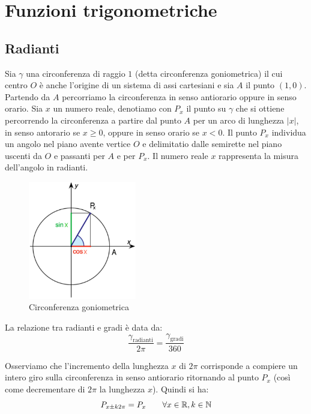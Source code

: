 
\chapter{Funzioni trigonometriche} %

\label{ch:trigonometria} %

\section{Radianti}

Sia $\gamma$ una circonferenza di raggio $1$ (detta circonferenza goniometrica) il cui centro $O$ è anche l'origine di un sistema di assi cartesiani e sia $A$ il punto $(1,0)$.
Partendo da $A$ percorriamo la circonferenza in senso antiorario oppure in senso orario.
Sia $x$ un numero reale, denotiamo con $P_x$ il punto su $\gamma$ che si ottiene percorrendo la circonferenza a partire dal punto $A$ per un arco di lunghezza $|x|$, in senso antorario se $x \geq 0$, oppure in senso orario se $x<0$.
Il punto $P_x$ individua un angolo nel piano avente vertice $O$ e delimitatio dalle semirette nel piano uscenti da $O$ e passanti per $A$ e per $P_x$.
Il numero reale $x$ rappresenta la misura dell'angolo in radianti.

\begin{figure}
  \begin{center}
    \includegraphics[width=0.42\textwidth]{gfx/4/circonferenza.png}
  \end{center}
  \caption{Circonferenza goniometrica}\label{fig:goniometrica}
\end{figure}

La relazione tra radianti e gradi è data da:
\[\frac{\gamma_{\text{radianti}}}{2\pi}=\frac{\gamma_{\text{gradi}}}{360}\]

Osserviamo che l'incremento della lunghezza $x$ di $2\pi$ corrisponde a compiere un intero giro sulla circonferenza in senso antiorario ritornando al punto $P_x$ (così come decrementare di $2\pi$ la lunghezza $x$). Quindi si ha:
\[P_{x\pm k2\pi}=P_x \qquad \forall x \in \mathbb{R}, k \in \mathbb{N}\]

